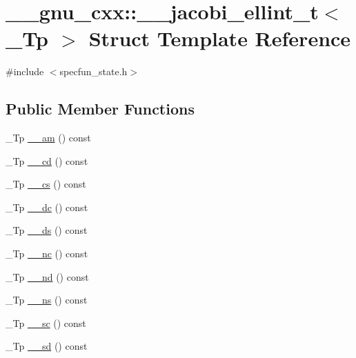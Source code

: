 \hypertarget{struct____gnu__cxx_1_1____jacobi__ellint__t}{}\section{\+\_\+\+\_\+gnu\+\_\+cxx\+:\+:\+\_\+\+\_\+jacobi\+\_\+ellint\+\_\+t$<$ \+\_\+\+Tp $>$ Struct Template Reference}
\label{struct____gnu__cxx_1_1____jacobi__ellint__t}


{\ttfamily \#include $<$specfun\+\_\+state.\+h$>$}

\subsection*{Public Member Functions}
\begin{DoxyCompactItemize}
\item 
\+\_\+\+Tp \hyperlink{struct____gnu__cxx_1_1____jacobi__ellint__t_ab9ac21f42a1fc90e86ba76394e413ea7}{\+\_\+\+\_\+am} () const
\item 
\+\_\+\+Tp \hyperlink{struct____gnu__cxx_1_1____jacobi__ellint__t_abd3b74424490d59d6c875c129776e3e5}{\+\_\+\+\_\+cd} () const
\item 
\+\_\+\+Tp \hyperlink{struct____gnu__cxx_1_1____jacobi__ellint__t_a62a359aed4948d6148be0bded41a6982}{\+\_\+\+\_\+cs} () const
\item 
\+\_\+\+Tp \hyperlink{struct____gnu__cxx_1_1____jacobi__ellint__t_aefd62aec07250eff1fd91809ee6e3c01}{\+\_\+\+\_\+dc} () const
\item 
\+\_\+\+Tp \hyperlink{struct____gnu__cxx_1_1____jacobi__ellint__t_a95f2e2be7363103da283e15493b24bd7}{\+\_\+\+\_\+ds} () const
\item 
\+\_\+\+Tp \hyperlink{struct____gnu__cxx_1_1____jacobi__ellint__t_aee80a8bcb8314b98dc253459d9bb97c8}{\+\_\+\+\_\+nc} () const
\item 
\+\_\+\+Tp \hyperlink{struct____gnu__cxx_1_1____jacobi__ellint__t_ae9b801e3c7db84c7a632b0860e79a750}{\+\_\+\+\_\+nd} () const
\item 
\+\_\+\+Tp \hyperlink{struct____gnu__cxx_1_1____jacobi__ellint__t_a0cbaac72a887b3630554d0c07fcb3746}{\+\_\+\+\_\+ns} () const
\item 
\+\_\+\+Tp \hyperlink{struct____gnu__cxx_1_1____jacobi__ellint__t_ad8fd5ecb9ccd303c0e567131088841bb}{\+\_\+\+\_\+sc} () const
\item 
\+\_\+\+Tp \hyperlink{struct____gnu__cxx_1_1____jacobi__ellint__t_a17ff1af009b6c0cb7d240a9b5acf192d}{\+\_\+\+\_\+sd} () const
\end{DoxyCompactItemize}
